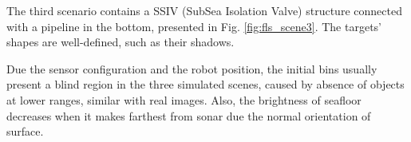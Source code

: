 \documentclass[final,5p,times]{elsarticle}
\begin{document}
The third scenario contains a SSIV (SubSea Isolation Valve) structure connected with a pipeline in the bottom, presented in Fig. \ref{fig:fls_scene3}. The targets' shapes are well-defined, such as their shadows.

Due the sensor configuration and the robot position, the initial bins usually present a blind region in the three simulated scenes, caused by absence of objects at lower ranges, similar with real images. Also, the brightness of seafloor decreases when it makes farthest from sonar due the normal orientation of surface.

\begin{figure}[!h]
    \centering
\end{figure}
\end{document}
